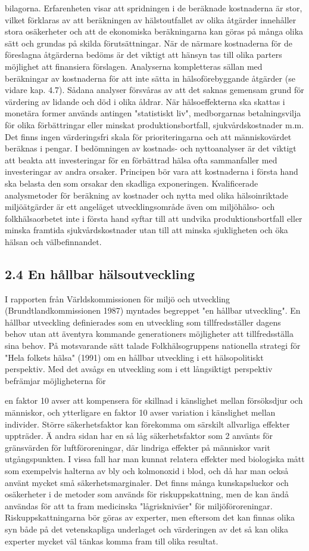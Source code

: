 bilagorna. Erfarenheten visar att spridningen i de beräknade kostnaderna är stor, vilket förklaras av att beräkningen av hälstoutfallet av olika åtgärder innehåller stora osäkerheter och att de ekonomiska beräkningarna kan göras på många olika sätt och grundas på skilda förutsättningar. När de närmare kostnaderna för de föreslagna åtgärderna bedöms är det viktigt att hänsyn tas till olika parters möjlighet att finansiera förslagen.
Analyserna kompletteras sällan med beräkningar av kostnaderna för att inte sätta in hälsoförebyggande åtgärder (se vidare kap. 4.7). Sådana analyser försvåras av att det saknas gemensam grund för värdering av lidande och död i olika åldrar. När hälsoeffekterna ska skattas i monetära former används antingen "statistiskt liv", medborgarnas betalningsvilja för olika förbättringar eller minskat produktionsbortfall, sjukvårdskostnader m.m. Det finns ingen värderingsfri skala för prioriteringarna och att människovärdet beräknas i pengar.
I bedömningen av kostnads- och nyttoanalyser är det viktigt att beakta att investeringar för en förbättrad hälsa ofta sammanfaller med investeringar av andra orsaker. Principen bör vara att kostnaderna i första hand ska belasta den som orsakar den skadliga exponeringen.
Kvalificerade analysmetoder för beräkning av kostnader och nytta med olika hälsoinriktade miljöätgärder är ett angeläget utvecklingsområde även om miljöhälso- och folkhälsaorbetet inte i första hand syftar till att undvika produktionsbortfall eller minska framtida sjukvårdskostnader utan till att minska sjukligheten och öka hälsan och välbefinnandet.
\subsection*{2.4 En hållbar hälsoutveckling}
I rapporten från Världskommissionen för miljö och utveckling (Brundtlandkommissionen 1987) myntades begreppet "en hållbar utveckling". En hållbar utveckling definierades som en utveckling som tillfredsställer dagens behov utan att äventyra kommande generationers möjligheter att tillfredsställa sina behov. På motsvarande sätt talade Folkhälsogruppens nationella strategi för "Hela folkets hälsa" (1991) om en hållbar utveckling i ett hälsopolitiskt perspektiv. Med det avsågs en utveckling som i ett långsiktigt perspektiv befrämjar möjligheterna för

en faktor 10 avser att kompensera för skillnad i känslighet mellan försöksdjur och människor, och ytterligare en faktor 10 avser variation i känslighet mellan individer. Större säkerhetsfaktor kan förekomma om särskilt allvarliga effekter uppträder. Ä andra sidan har en så låg säkerhetsfaktor som 2 använts för gränsvärden för luftföroreningar, där lindriga effekter på människor varit utgångspunkten. I vissa fall har man kunnat relatera effekter med biologiska mått som exempelvis halterna av bly och kolmonoxid i blod, och då har man också använt mycket små säkerhetsmarginaler.
Det finns många kunskapsluckor och osäkerheter i de metoder som används för riskuppskattning, men de kan ändå användas för att ta fram medicinska "lågriskniväer" för miljöföroreningar. Riskuppskattningarna bör göras av experter, men eftersom det kan finnas olika syn både på det vetenskapliga underlaget och värderingen av det så kan olika experter mycket väl tänkas komma fram till olika resultat.
